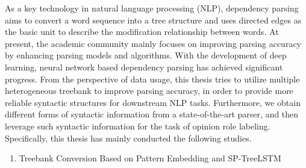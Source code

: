 
\begin{eabstract}



	As a key technology in natural language processing (NLP), dependency parsing aims to convert a word sequence into a tree structure and uses directed edges as the basic unit to describe the modification relationship between words.
	At present, the academic community mainly focuses on improving parsing accuracy  by enhancing parsing models and algorithms. With the development of deep learning, neural network based dependency parsing has achieved significant progress.
	From the perspective of data usage, this thesis tries to utilize multiple heterogeneous treebank to improve parsing accuracy,  in order to provide more reliable syntactic structures for downstream NLP  tasks.
	Furthermore, we obtain different forms of syntactic information from a state-of-the-art parser, and then leverage such syntactic information for the task of opinion role labeling.
	Specifically, this thesis has mainly conducted the following studies.

	\begin{enumerate}
		\item  Treebank Conversion Based on Pattern Embedding and SP-TreeLSTM


\end{enumerate}
\end{eabstract}
